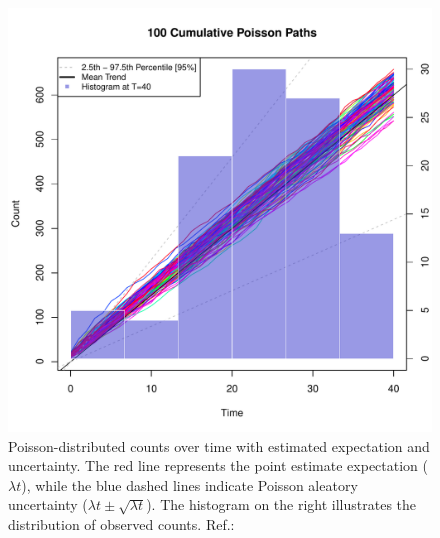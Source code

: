 \begin{table}[h!]
\centering
{}
\caption{Modeling Count Data with Specified Levels of Aleatory and Epistemic Uncertainty.}
\label{tab:count_modeling}
\end{table}

\begin{figure}
\begin{knitrout}
\color{fgcolor}

{\centering \includegraphics[width=\textwidth-3cm]{figure/ch02_figunnamed-chunk-3-1} 

}


\end{knitrout}
  \caption{Poisson-distributed counts over time with estimated expectation and uncertainty. The red line represents the point estimate expectation ($\lambda t$), while the blue dashed lines indicate Poisson aleatory uncertainty ($\lambda t \pm \sqrt{\lambda t}$). The histogram on the right illustrates the distribution of observed counts. Ref.: \cite{spiegelhalter2011visualizing}}
  \label{fig:2_2}
\end{figure}


